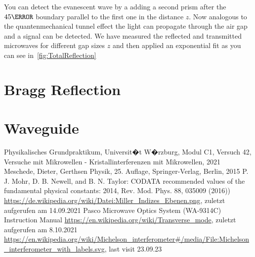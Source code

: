 \documentclass[a4paper,10pt,twocolumn]{article}
\begin{document}
    You can detect the evanescent wave by a adding a second prism after the $ 45\degree$ boundary parallel to the first one
    in the distance $z$.
    Now analogous to the quantenmechanical tunnel effect the light can propagate through the air gap and a signal can be
    detected.
    We have measured the reflected and transmitted microwaves for different gap sizes $z$ and then applied an exponential 
    fit as you can see in~\ref{fig:TotalReflection}


    \section{Bragg Reflection}

    

    \section{Waveguide}

    \begin{thebibliography}{}    %
         Physikalisches Grundpraktikum, Universit�t W�rzburg, Modul C1, Versuch 42, Versuche mit Mikrowellen - Kristallinterferenzen mit Mikrowellen, 2021
         Meschede, Dieter, Gerthsen Physik, 25. Auflage, Springer-Verlag, Berlin, 2015
         P. J. Mohr, D. B. Newell, and B. N. Taylor: \grqq CODATA
        recommended values of the fundamental physical constants: 2014\grqq , Rev. Mod. Phys.
        88, 035009 (2016))
         \url{https://de.wikipedia.org/wiki/Datei:Miller_Indizes_Ebenen.png}, zuletzt aufgerufen am 14.09.2021
         Pasco Microwave Optics System (WA-9314C) Instruction Manual
         \url{https://en.wikipedia.org/wiki/Transverse_mode}, zuletzt aufgerufen am 8.10.2021
         \url{https://en.wikipedia.org/wiki/Michelson_interferometer#/media/File:Michelson_interferometer_with_labels.svg}, last visit 23.09.23
    \end{thebibliography}
    
\end{document}
